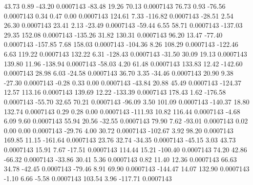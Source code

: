        43.73        0.89      -43.20     0.0007143
      -83.48       19.26       70.13     0.0007143
       76.73        0.93      -76.56     0.0007143
        0.34        0.47        0.00     0.0007143
      124.61        7.33     -116.82     0.0007143
      -28.51        2.54       26.30     0.0007143
       23.41        2.13      -23.49     0.0007143
      -59.44        6.55       58.71     0.0007143
     -137.03       29.35      152.08     0.0007143
     -135.26       31.82      130.31     0.0007143
       96.20       13.47      -77.40     0.0007143
     -157.85        7.68      158.03     0.0007143
     -104.36        8.26      108.29     0.0007143
     -122.46        6.63      119.22     0.0007143
      132.22        6.31     -128.43     0.0007143
      -31.50       30.09       19.13     0.0007143
      139.80       11.96     -138.94     0.0007143
      -58.03        4.20       61.48     0.0007143
      133.83       12.42     -142.60     0.0007143
       28.98        6.03      -24.58     0.0007143
       36.70        3.35      -34.46     0.0007143
       20.90        9.38      -27.30     0.0007143
       -0.28        0.33        0.00     0.0007143
      -43.84       20.88       45.49     0.0007143
     -124.37       12.57      113.16     0.0007143
      139.69       12.22     -133.39     0.0007143
      178.43        1.62     -176.58     0.0007143
      -55.70       32.65       70.21     0.0007143
      -96.09        3.50      101.09     0.0007143
     -140.37       18.80      132.74     0.0007143
        0.29        0.28        0.00     0.0007143
     -111.93       10.82      116.44     0.0007143
       -4.68        6.09        9.60     0.0007143
       55.94       20.56      -32.55     0.0007143
       79.90        7.62      -93.01     0.0007143
        0.02        0.00        0.00     0.0007143
      -29.76        4.00       30.72     0.0007143
     -102.67        3.92       98.20     0.0007143
      169.85       11.15     -161.64     0.0007143
       23.76       32.74      -34.35     0.0007143
      -45.15        3.03       43.73     0.0007143
       15.91        7.67      -17.51     0.0007143
      114.44       15.21     -100.40     0.0007143
       74.20       42.86      -66.32     0.0007143
      -33.86       30.41        5.36     0.0007143
        0.82       11.40       12.36     0.0007143
       66.63       34.78      -42.45     0.0007143
      -79.46        8.91       69.90     0.0007143
     -144.47       14.07      132.90     0.0007143
       -1.10        6.66       -5.58     0.0007143
      103.54        3.96     -117.71     0.0007143
